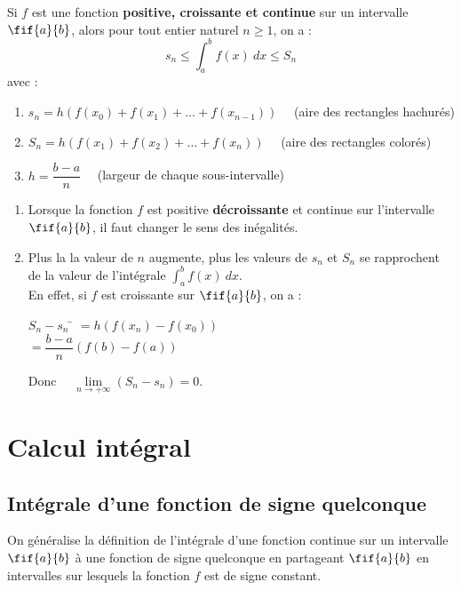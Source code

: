 \documentclass[a4paper,11pt,cours]{nsi} %
\begin{document}
\begin{propriete}[]
    Si $f$ est une fonction \textbf{positive, croissante et continue} sur un intervalle $\fif{a}{b}$, alors pour tout entier naturel $n \geqslant 1$, on a :
    $$s_n\leqslant \int_a^b f(x) \ dx \leqslant S_n$$
    avec :
    \begin{enumerate}[label=\textbullet]
        \item $s_n=h\left(f(x_0)+f(x_1)+\ldots+f(x_{n-1})\right)\quad$ (aire des rectangles hachurés)
        \item $S_n=h\left(f(x_1)+f(x_2)+\ldots+f(x_n)\right)\quad$ (aire des rectangles colorés)
        \item $h=\dfrac{b-a}{n}\quad$ (largeur de chaque sous-intervalle)
    \end{enumerate}
\end{propriete}

\begin{remarque}[s]
    \begin{enumerate}[label=\textbullet]
        \item Lorsque la fonction $f$ est positive \textbf{décroissante} et continue sur l'intervalle $\fif{a}{b}$, il faut changer le sens des inégalités.
        \item Plus la la valeur de $n$ augmente, plus les valeurs de $s_n$ et $S_n$ se rapprochent de la valeur de l'intégrale $\displaystyle \int_a^b f(x) \ dx$.\\[.5em]
        En effet, si $f$ est croissante sur $\fif{a}{b}$, on a :
        \begin{tabbing}
            $S_n-s_n$ \= $=h\left(f(x_n)-f(x_0)\right)$\\
            \> $=\dfrac{b-a}{n}\left(f(b)-f(a)\right)$
        \end{tabbing}
        Donc $\quad \lim\limits_{n \to +\infty} (S_n-s_n) = 0$.
    \end{enumerate}
\end{remarque}

\section{Calcul intégral}

\subsection*{Intégrale d'une fonction de signe quelconque}
On généralise la définition de l'intégrale d'une fonction continue sur un intervalle $\fif{a}{b}$ à une fonction de signe quelconque en partageant $\fif{a}{b}$ en intervalles sur lesquels la fonction $f$ est de signe constant.
\end{document}
